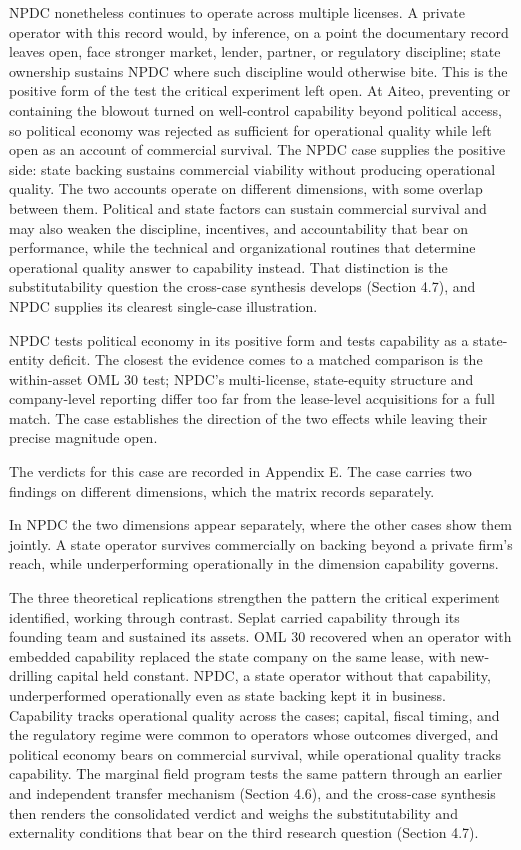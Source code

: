 NPDC nonetheless continues to operate across multiple licenses. A
private operator with this record would, by inference, on a point the
documentary record leaves open, face stronger market, lender, partner,
or regulatory discipline; state ownership sustains NPDC where such
discipline would otherwise bite. This is the positive form of the test
the critical experiment left open. At Aiteo, preventing or containing
the blowout turned on well-control capability beyond political access,
so political economy was rejected as sufficient for operational quality
while left open as an account of commercial survival. The NPDC case
supplies the positive side: state backing sustains commercial viability
without producing operational quality. The two accounts operate on
different dimensions, with some overlap between them. Political and
state factors can sustain commercial survival and may also weaken the
discipline, incentives, and accountability that bear on performance,
while the technical and organizational routines that determine
operational quality answer to capability instead. That distinction is
the substitutability question the cross-case synthesis develops (Section
4.7), and NPDC supplies its clearest single-case illustration.

NPDC tests political economy in its positive form and tests capability
as a state-entity deficit. The closest the evidence comes to a matched
comparison is the within-asset OML 30 test; NPDC's multi-license,
state-equity structure and company-level reporting differ too far from
the lease-level acquisitions for a full match. The case establishes the
direction of the two effects while leaving their precise magnitude open.

The verdicts for this case are recorded in Appendix E. The case carries
two findings on different dimensions, which the matrix records
separately.

In NPDC the two dimensions appear separately, where the other cases show
them jointly. A state operator survives commercially on backing beyond a
private firm's reach, while underperforming operationally in the
dimension capability governs.

The three theoretical replications strengthen the pattern the critical
experiment identified, working through contrast. Seplat carried
capability through its founding team and sustained its assets. OML 30
recovered when an operator with embedded capability replaced the state
company on the same lease, with new-drilling capital held constant.
NPDC, a state operator without that capability, underperformed
operationally even as state backing kept it in business. Capability
tracks operational quality across the cases; capital, fiscal timing, and
the regulatory regime were common to operators whose outcomes diverged,
and political economy bears on commercial survival, while operational
quality tracks capability. The marginal field program tests the same
pattern through an earlier and independent transfer mechanism (Section
4.6), and the cross-case synthesis then renders the consolidated verdict
and weighs the substitutability and externality conditions that bear on
the third research question (Section 4.7).

